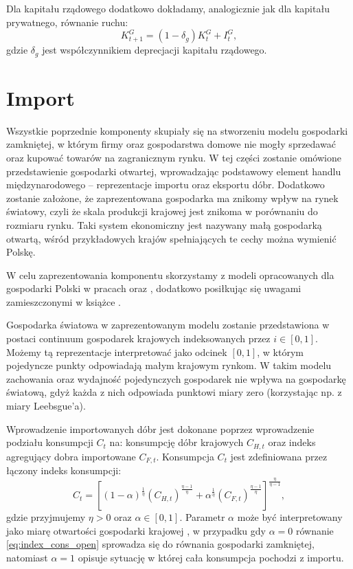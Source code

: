 Dla kapitału rządowego dodatkowo dokładamy, analogicznie jak dla kapitału prywatnego, równanie ruchu:
\begin{equation}
    K_{t+1}^G = (1 - \delta_g)K_{t}^{G} + I_t^G,
\end{equation}
gdzie $\delta_g$ jest współczynnikiem deprecjacji kapitału rządowego.

\section{Import}

Wszystkie poprzednie komponenty skupiały się na stworzeniu modelu gospodarki zamkniętej, w którym firmy oraz gospodarstwa domowe nie mogły sprzedawać oraz kupować towarów na zagranicznym rynku. W tej części zostanie omówione przedstawienie gospodarki otwartej, wprowadzając podstawowy element handlu międzynarodowego -- reprezentacje importu oraz eksportu dóbr. Dodatkowo zostanie założone, że zaprezentowana gospodarka ma znikomy wpływ na rynek światowy, czyli że skala produkcji krajowej jest znikoma w porównaniu do rozmiaru rynku. Taki system ekonomiczny jest nazywany małą gospodarką otwartą, wśród przykładowych krajów spełniających te cechy można wymienić Polskę.

W celu zaprezentowania komponentu skorzystamy z modeli opracowanych dla gospodarki Polski w pracach \cite{grabek2007soe} oraz \cite{nbpKoloch}, dodatkowo posiłkując się uwagami zamieszczonymi w książce \cite{gali}.

Gospodarka światowa w zaprezentowanym modelu zostanie przedstawiona w postaci continuum gospodarek krajowych indeksowanych przez $i \in [0, 1]$. Możemy tą reprezentacje interpretować jako odcinek $[0,1]$, w którym pojedyncze punkty odpowiadają małym krajowym rynkom. W takim modelu zachowania oraz wydajność pojedynczych gospodarek nie wpływa na gospodarkę światową, gdyż każda z nich odpowiada punktowi miary zero (korzystając np. z miary Leebsgue'a). 

Wprowadzenie importowanych dóbr jest dokonane poprzez wprowadzenie podziału konsumpcji $C_t$ na: konsumpcję dóbr krajowych $C_{H,t}$ oraz indeks agregujący dobra importowane $C_{F,t}$. Konsumpcja $C_t$ jest zdefiniowana przez łączony indeks konsumpcji:
\begin{equation}
    \label{eq:index_cons_open}
    C_t = [(1 - \alpha)^{\frac{1}{\eta}}(C_{H,t})^{\frac{\eta-1}{\eta}} + \alpha^{\frac{1}{\eta}}(C_{F,t})^{\frac{\eta-1}{\eta}}]^{\frac{\eta}{\eta-1}},
\end{equation}
gdzie przyjmujemy $\eta > 0$ oraz $\alpha \in [0,1]$. Parametr $\alpha$ może być interpretowany jako miarę otwartości gospodarki krajowej \cite{nbpKoloch}, w przypadku gdy $\alpha = 0$ równanie \eqref{eq:index_cons_open} sprowadza się do równania gospodarki zamkniętej, natomiast $\alpha = 1$ opisuje sytuację w której cała konsumpcja pochodzi z importu.

